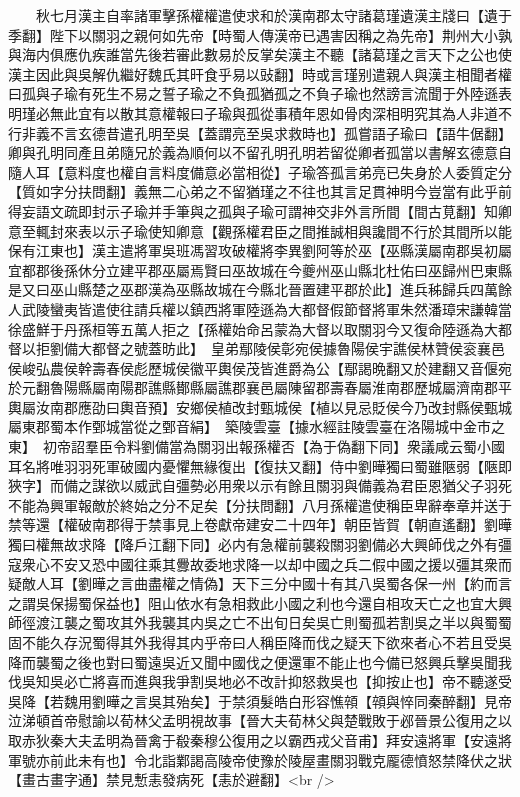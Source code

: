 　　秋七月漢主自率諸軍擊孫權權遣使求和於漢南郡太守諸葛瑾遺漢主牋曰【遺于季翻】陛下以關羽之親何如先帝【時蜀人傳漢帝已遇害因稱之為先帝】荆州大小孰與海内俱應仇疾誰當先後若審此數易於反掌矣漢主不聽【諸葛瑾之言天下之公也使漢主因此與吳解仇繼好魏氏其旰食乎易以䜴翻】時或言瑾别遣親人與漢主相聞者權曰孤與子瑜有死生不易之誓子瑜之不負孤猶孤之不負子瑜也然謗言流聞于外陸遜表明瑾必無此宜有以散其意權報曰子瑜與孤從事積年恩如骨肉深相明究其為人非道不行非義不言玄德昔遣孔明至吳【蓋謂亮至吳求救時也】孤嘗語子瑜曰【語牛倨翻】卿與孔明同產且弟隨兄於義為順何以不留孔明孔明若留從卿者孤當以書解玄德意自隨人耳【意料度也權自言料度備意必當相從】子瑜答孤言弟亮已失身於人委質定分【質如字分扶問翻】義無二心弟之不留猶瑾之不往也其言足貫神明今豈當有此乎前得妄語文疏即封示子瑜并手筆與之孤與子瑜可謂神交非外言所間【間古莧翻】知卿意至輒封來表以示子瑜使知卿意【觀孫權君臣之間推誠相與讒間不行於其間所以能保有江東也】漢主遣將軍吳班馮習攻破權將李異劉阿等於巫【巫縣漢屬南郡吳初屬宜都郡後孫休分立建平郡巫屬焉賢曰巫故城在今夔州巫山縣北杜佑曰巫歸州巴東縣是又曰巫山縣楚之巫郡漢為巫縣故城在今縣北晉置建平郡於此】進兵秭歸兵四萬餘人武陵蠻夷皆遣使往請兵權以鎮西將軍陸遜為大都督假節督將軍朱然潘璋宋謙韓當徐盛鮮于丹孫桓等五萬人拒之【孫權始命呂蒙為大督以取關羽今又復命陸遜為大都督以拒劉備大都督之號蓋昉此】　皇弟鄢陵侯彰宛侯據魯陽侯宇譙侯林贊侯衮襄邑侯峻弘農侯幹壽春侯彪歷城侯徽平輿侯茂皆進爵為公【鄢謁晩翻又於建翻又音偃宛於元翻魯陽縣屬南陽郡譙縣鄼縣屬譙郡襄邑屬陳留郡壽春屬淮南郡歷城屬濟南郡平輿屬汝南郡應劭曰輿音預】安鄉侯植改封甄城侯【植以見忌貶侯今乃改封縣侯甄城屬東郡蜀本作鄄城當從之鄄音絹】　築陵雲臺【據水經註陵雲臺在洛陽城中金市之東】　初帝詔羣臣令料劉備當為關羽出報孫權否【為于偽翻下同】衆議咸云蜀小國耳名將唯羽羽死軍破國内憂懼無緣復出【復扶又翻】侍中劉曄獨曰蜀雖陿弱【陿即狹字】而備之謀欲以威武自彊勢必用衆以示有餘且關羽與備義為君臣恩猶父子羽死不能為興軍報敵於終始之分不足矣【分扶問翻】八月孫權遣使稱臣卑辭奉章并送于禁等還【權破南郡得于禁事見上卷獻帝建安二十四年】朝臣皆賀【朝直遙翻】劉曄獨曰權無故求降【降戶江翻下同】必内有急權前襲殺關羽劉備必大興師伐之外有彊寇衆心不安又恐中國往乘其釁故委地求降一以却中國之兵二假中國之援以彊其衆而疑敵人耳【劉曄之言曲盡權之情偽】天下三分中國十有其八吳蜀各保一州【約而言之謂吳保揚蜀保益也】阻山依水有急相救此小國之利也今還自相攻天亡之也宜大興師徑渡江襲之蜀攻其外我襲其内吳之亡不出旬日矣吳亡則蜀孤若割吳之半以與蜀蜀固不能久存況蜀得其外我得其内乎帝曰人稱臣降而伐之疑天下欲來者心不若且受吳降而襲蜀之後也對曰蜀遠吳近又聞中國伐之便還軍不能止也今備已怒興兵擊吳聞我伐吳知吳必亡將喜而進與我爭割吳地必不改計抑怒救吳也【抑按止也】帝不聽遂受吳降【若魏用劉曄之言吳其殆矣】于禁須髮皓白形容憔顇【顇與悴同秦醉翻】見帝泣涕頓首帝慰諭以荀林父孟明視故事【晉大夫荀林父與楚戰敗于邲晉景公復用之以取赤狄秦大夫孟明為晉禽于殽秦穆公復用之以霸西戎父音甫】拜安遠將軍【安遠將軍號亦前此未有也】令北詣鄴謁高陵帝使豫於陵屋畫關羽戰克龎德憤怒禁降伏之狀【畫古畫字通】禁見慙恚發病死【恚於避翻】<br />
